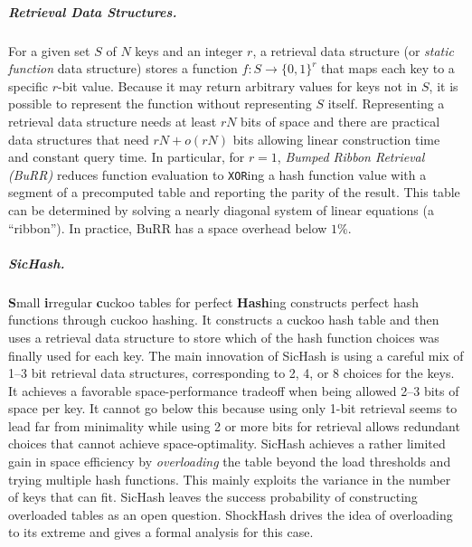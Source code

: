 \documentclass[a4paper,USenglish,cleveref]{lipics-v2021}
\newcommand{\myparagraph}[1]{\subparagraph*{#1}}
\begin{document}
\myparagraph{Retrieval Data Structures.}\label{s:retrieval}
For a given set $S$ of $N$ keys and an integer $r$, a retrieval data structure (or \emph{static function} data structure) stores a function $f: S\rightarrow\{0, 1\}^r$ that maps each key to a specific $r$-bit value.
Because it may return arbitrary values for keys not in $S$, it is possible to represent the function without representing $S$ itself.
Representing a retrieval data structure needs at least $rN$ bits of space and there are practical data structures that need $rN+o(rN)$ bits allowing linear construction time and constant query time.
In particular, for $r = 1$, \emph{Bumped Ribbon Retrieval (BuRR)} \cite{dillinger2022burr} reduces function evaluation to \texttt{XOR}ing a hash function value with a segment of a precomputed table and reporting the parity of the result.
This table can be determined by solving a nearly diagonal system of linear equations (a ``ribbon'').
In practice, BuRR has a space overhead below $1\%$.

\myparagraph{SicHash.}
{\bf S}mall {\bf i}rregular {\bf c}uckoo tables for perfect {\bf Hash}ing \cite{lehmann2023sichash} constructs perfect hash functions through cuckoo hashing.
It constructs a cuckoo hash table and then uses a retrieval data structure to store which of the hash function choices was finally used for each key.
The main innovation of SicHash is using a careful mix of \mbox{1--3} bit retrieval data structures, corresponding to 2, 4, or 8 choices for the keys.
It achieves a favorable space-performance tradeoff when being allowed 2--3 bits of space per key.
It cannot go below this because using only 1-bit retrieval seems to lead far from minimality while using 2 or more bits for retrieval allows redundant choices that cannot achieve space-optimality.
SicHash achieves a rather limited gain in space efficiency by \emph{overloading} the table beyond the load thresholds and trying multiple hash functions.
This mainly exploits the variance in the number of keys that can fit.
SicHash leaves the success probability of constructing overloaded tables as an open question.
ShockHash drives the idea of overloading to its extreme and gives a formal analysis for this case.
\end{document}

